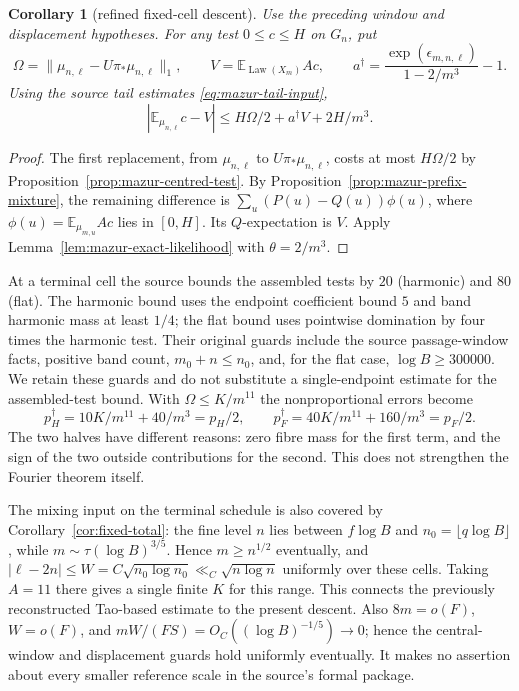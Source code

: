 \documentclass[11pt]{article}
\newtheorem{corollary}[proposition]{Corollary}
\theoremstyle{remark}\newtheorem{remark}[proposition]{Remark}
\begin{document}
\begin{corollary}[refined fixed-cell descent]
\label{cor:mazur-centred-descent}
Use the preceding window and displacement hypotheses. For any test
$0\le c\le H$ on $G_n$, put
\[
 \Omega=\|\mu_{n,\ell}-U\pi_*\mu_{n,\ell}\|_1,\qquad
 V=\mathbb E_{\operatorname{Law}(X_m)}Ac,\qquad
 a^\dagger=\frac{\exp(\epsilon_{m,n,\ell})}{1-2/m^3}-1 .
\]
Using the source tail estimates \eqref{eq:mazur-tail-input},
\begin{equation}
 |\mathbb E_{\mu_{n,\ell}}c-V|
 \le H\Omega/2+a^\dagger V+2H/m^3.
 \label{eq:mazur-centred-descent}
\end{equation}
\end{corollary}
\begin{proof}
The first replacement, from $\mu_{n,\ell}$ to $U\pi_*\mu_{n,\ell}$,
costs at most $H\Omega/2$ by Proposition~\ref{prop:mazur-centred-test}.
By Proposition~\ref{prop:mazur-prefix-mixture}, the remaining difference
is $\sum_u(P(u)-Q(u))\phi(u)$, where
$\phi(u)=\mathbb E_{\mu_{m,u}}Ac$ lies in $[0,H]$.
Its $Q$-expectation is $V$. Apply
Lemma~\ref{lem:mazur-exact-likelihood} with $\theta=2/m^3$.
\end{proof}

At a terminal cell the source bounds the assembled tests by $20$
(harmonic) and $80$ (flat). The harmonic bound uses the endpoint
coefficient bound $5$ and band harmonic mass at least $1/4$;
the flat bound uses pointwise domination by four times the harmonic
test. Their original guards include the source passage-window facts,
positive band count, $m_0+n\le n_0$, and, for the flat case,
$\log B\ge300000$. We retain these guards and do not substitute a
single-endpoint estimate for the assembled-test bound.
With $\Omega\le K/m^{11}$ the nonproportional errors become
\[
 p_H^\dagger=10K/m^{11}+40/m^3=p_H/2,\qquad
 p_F^\dagger=40K/m^{11}+160/m^3=p_F/2.
\]
The two halves have different reasons: zero fibre mass for the first
term, and the sign of the two outside contributions for the second.
This does not strengthen the Fourier theorem itself.

The mixing input on the terminal schedule is also covered by
Corollary~\ref{cor:fixed-total}: the fine level $n$ lies between
$f\log B$ and $n_0=\lfloor q\log B\rfloor$, while
$m\sim\tau(\log B)^{3/5}$. Hence $m\ge n^{1/2}$ eventually,
and $|\ell-2n|\le W=C\sqrt{n_0\log n_0}\ll_C\sqrt{n\log n}$
uniformly over these cells. Taking $A=11$ there gives a single finite
$K$ for this range. This connects the previously reconstructed Tao-based
estimate to the present descent. Also $8m=o(F)$, $W=o(F)$, and
$mW/(FS)=O_C((\log B)^{-1/5})\to0$; hence the central-window
and displacement guards hold uniformly eventually. It makes no assertion about every
smaller reference scale in the source's formal package.
\end{document}
